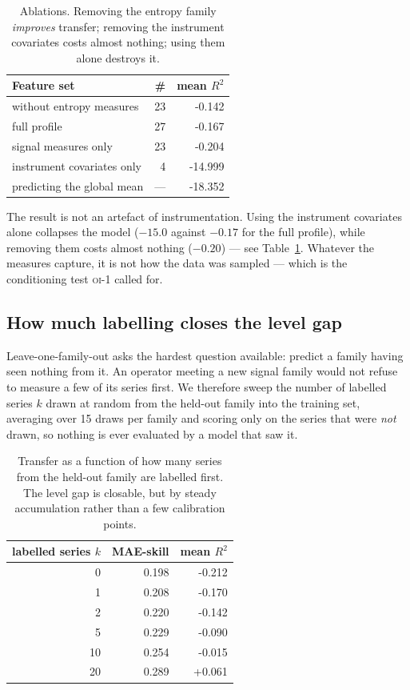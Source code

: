 \documentclass[11pt,a4paper]{article}
\newcommand{\num}[1]{#1}
\newcommand{\oi}[1]{\textsc{oi-#1}}
\begin{document}
\begin{table}[t]
\centering
\caption{Ablations. Removing the entropy family \emph{improves} transfer;
removing the instrument covariates costs almost nothing; using them alone
destroys it.}
\label{tab:ablation}
\small
\begin{tabular}{lrr}
\toprule
Feature set & \# & mean \(R^2\) \\
\midrule
without entropy measures   & 23 & \num{-0.142} \\
full profile               & 27 & \num{-0.167} \\
signal measures only       & 23 & \num{-0.204} \\
instrument covariates only & 4  & \num{-14.999} \\
\midrule
predicting the global mean & --- & \num{-18.352} \\
\bottomrule
\end{tabular}
\end{table}


The result is not an artefact of instrumentation. Using the instrument covariates
alone collapses the model (\(-15.0\) against \(-0.17\) for the full profile),
while removing them costs almost nothing (\(-0.20\)) --- see
Table~\ref{tab:ablation}. Whatever the
measures capture, it is not how the data was sampled --- which is the
conditioning test \oi{1} called for.

\subsection{How much labelling closes the level gap}
\label{sec:fewshot}

Leave-one-family-out asks the hardest question available: predict a family
having seen nothing from it. An operator meeting a new signal family would not
refuse to measure a few of its series first. We therefore sweep the number of
labelled series \(k\) drawn at random from the held-out family into the training
set, averaging over \num{15} draws per family and scoring only on the series
that were \emph{not} drawn, so nothing is ever evaluated by a model that saw it.

\begin{table}[t]
\centering
\caption{Transfer as a function of how many series from the held-out family are
labelled first. The level gap is closable, but by steady accumulation rather
than a few calibration points.}
\label{tab:fewshot}
\small
\begin{tabular}{rrr}
\toprule
labelled series \(k\) & MAE-skill & mean \(R^2\) \\
\midrule
0  & \num{0.198} & \num{-0.212} \\
1  & \num{0.208} & \num{-0.170} \\
2  & \num{0.220} & \num{-0.142} \\
5  & \num{0.229} & \num{-0.090} \\
10 & \num{0.254} & \num{-0.015} \\
20 & \num{0.289} & \num{+0.061} \\
\bottomrule
\end{tabular}
\end{table}
\end{document}
